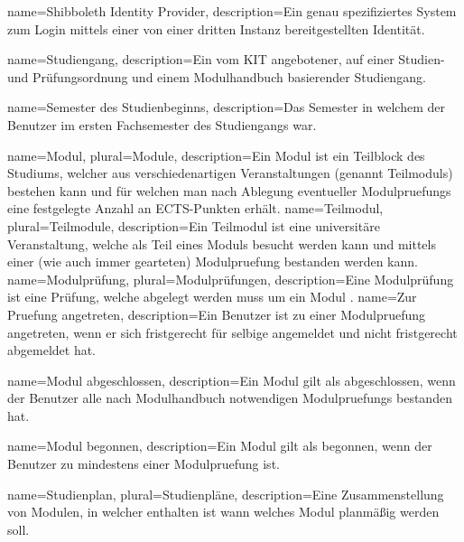 {
	name=Shibboleth Identity Provider,
	description={Ein genau spezifiziertes System zum Login mittels einer von einer dritten Instanz bereitgestellten Identität.}
}

{
	name=Studiengang,
	description={Ein vom KIT angebotener, auf einer Studien- und Prüfungsordnung und einem Modulhandbuch basierender Studiengang.}
}

{
	name=Semester des Studienbeginns,
	description={Das Semester in welchem der \gls{Benutzer} im ersten Fachsemester des \gls{Studiengang}s war.}
}

{
	name=Modul,
	plural=Module,
	description={Ein Modul ist ein Teilblock des Studiums, welcher aus verschiedenartigen Veranstaltungen (genannt \glspl{Teilmodul}) bestehen kann und für welchen man nach Ablegung eventueller \glspl{Modulpruefung} eine festgelegte Anzahl an ECTS-Punkten erhält.}
}
{
	name=Teilmodul,
	plural=Teilmodule,
	description={Ein Teilmodul ist eine universitäre Veranstaltung, welche als Teil eines Moduls besucht werden kann und mittels einer (wie auch immer gearteten) \gls{Modulpruefung} bestanden werden kann.}
}
{
	name=Modulprüfung,
	plural=Modulprüfungen,
	description={Eine Modulprüfung ist eine Prüfung, welche abgelegt werden muss um ein Modul .}
}
{
	name=Zur Pruefung angetreten,
	description={Ein \gls{Benutzer} ist zu einer \gls{Modulpruefung} angetreten, wenn er sich fristgerecht für selbige angemeldet und nicht fristgerecht abgemeldet hat.}
}

{
	name=Modul abgeschlossen,
	description={Ein \gls{Modul} gilt als abgeschlossen, wenn der \gls{Benutzer} alle nach Modulhandbuch notwendigen \glspl{Modulpruefung} bestanden hat.}
}

{
	name=Modul begonnen,
	description={Ein \gls{Modul} gilt als begonnen, wenn der \gls{Benutzer} zu mindestens einer \gls{Modulpruefung}  ist.}
}

{
	name=Studienplan,
	plural=Studienpläne,
	description={Eine Zusammenstellung von Modulen, in welcher enthalten ist wann welches Modul planmäßig  werden soll.}
}